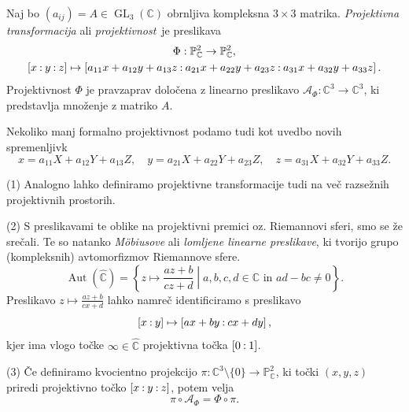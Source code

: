 \documentclass[mat1]{fmfdelo}
\numberwithin{equation}{section}
\newcommand{\C}{\mathbb C}
\newcommand{\PC}{\mathbb{P}^2_\C}
\newcommand{\RS}{\widehat{\C}}
\newcommand{\pcoor}[1]{%
\begingroup\lccode`~=`: \lowercase{\endgroup
\edef~}{\mathbin{\mathchar\the\mathcode`:}\nobreak}%
\left[%
\begingroup
\mathcode`:=\string"8000
#1%
\endgroup
\right]%
}
\DeclareMathOperator{\GL}{GL}
\DeclareMathOperator{\Aut}{Aut}
\theoremstyle{definition}
\begin{document}
\begin{definicija}
    Naj bo $(a_{ij}) = A \in \GL_3(\C)$ obrnljiva kompleksna $3 \times 3$ matrika. \emph{Projektivna transformacija} ali \emph{projektivnost} je preslikava
        \begin{gather*}
            \Phi : \PC \to \PC,\\
            \pcoor{x:y:z} \mapsto \pcoor{a_{11}x + a_{12}y + a_{13}z: a_{21}x + a_{22}y + a_{23}z: a_{31}x + a_{32}y + a_{33}z}.
        \end{gather*}
    Projektivnost $\Phi$ je pravzaprav določena z linearno preslikavo $\mathcal{A}_{\Phi} : \C^3 \to \C^3$, ki predstavlja množenje z matriko $A$.

    Nekoliko manj formalno projektivnost podamo tudi kot uvedbo novih spremenljivk 
    \[
        x = a_{11}X + a_{12}Y + a_{13}Z, \quad y = a_{21}X + a_{22}Y + a_{23}Z, \quad z = a_{31}X + a_{32}Y + a_{33}Z.  
    \]
\end{definicija}

\begin{opomba}
        (1) Analogno lahko definiramo projektivne transformacije tudi na več razsežnih projektivnih prostorih. 

        (2) S preslikavami te oblike na projektivni premici oz. Riemannovi sferi, smo se že srečali. Te so natanko \emph{Möbiusove} ali \emph{lomljene linearne preslikave}, ki tvorijo grupo (kompleksnih) avtomorfizmov Riemannove sfere.
        $$\Aut(\RS) = \left\{ z \mapsto \frac{az + b}{cz +d} \middle\vert a,b,c,d \in \C \text{ in }  ad - bc \neq 0 \right\}.$$
        Preslikavo $z \mapsto \tfrac{az + b}{cx +d}$ lahko namreč identificiramo s preslikavo 
        \[
            \pcoor{x:y} \mapsto \pcoor{ax + by: cx + dy},  
        \]
        kjer ima vlogo točke $\infty \in \RS$ projektivna točka $\pcoor{0:1}$. 

        (3) Če definiramo kvocientno projekcijo $\pi : \C^3 \setminus \{0\} \to \PC$, ki točki $(x,y,z)$ priredi projektivno točko $\pcoor{x:y:z}$, potem velja 
        $$\pi \circ \mathcal{A}_\Phi = \Phi \circ \pi.$$
\end{opomba}
\end{document}
